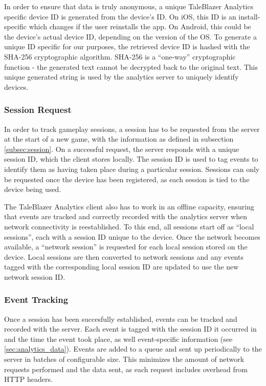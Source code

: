 In order to ensure that data is truly anonymous, a unique TaleBlazer Analytics specific device ID is generated from the device's ID. On iOS, this ID is an install-specific which changes if the user reinstalls the app. On Android, this could be the device's actual device ID, depending on the version of the OS. To generate a unique ID specific for our purposes, the retrieved device ID is hashed with the SHA-256 cryptographic algorithm. SHA-256 is a ``one-way'' cryptographic function - the generated text cannot be decrypted back to the original text. This unique generated string is used by the analytics server to uniquely identify devices. 

\subsubsection{Session Request}
\label{subsubsec:session_request}

In order to track gameplay sessions, a session has to be requested from the server at the start of a new game, with the information as defined in subsection \ref{subsec:session}. On a successful request, the server responds with a unique session ID, which the client stores locally. The session ID is used to tag events to identify them as having taken place during a particular session. Sessions can only be requested once the device has been registered, as each session is tied to the device being used.

The TaleBlazer Analytics client also has to work in an offline capacity, ensuring that events are tracked and correctly recorded with the analytics server when network connectivity is reestablished. To this end, all sessions start off as ``local sessions'', each with a session ID unique to the device. Once the network becomes available, a ``network session'' is requested for each local session stored on the device. Local sessions are then converted to network sessions and any events tagged with the corresponding local session ID are updated to use the new network session ID. 

\subsubsection{Event Tracking}
Once a session has been succesfully established, events can be tracked and recorded with the server. Each event is tagged with the session ID it occurred in and the time the event took place, as well event-specific information (see \ref{sec:analytics_data}). Events are added to a queue and sent up periodically to the server in batches of configurable size. This minimizes the amount of network requests performed and the data sent, as each request includes overhead from HTTP headers. 

